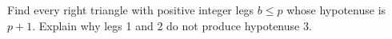 Find every right triangle with positive integer legs $b\le p$ whose hypotenuse is $p+1$. Explain why legs 1 and 2 do not produce hypotenuse 3.
